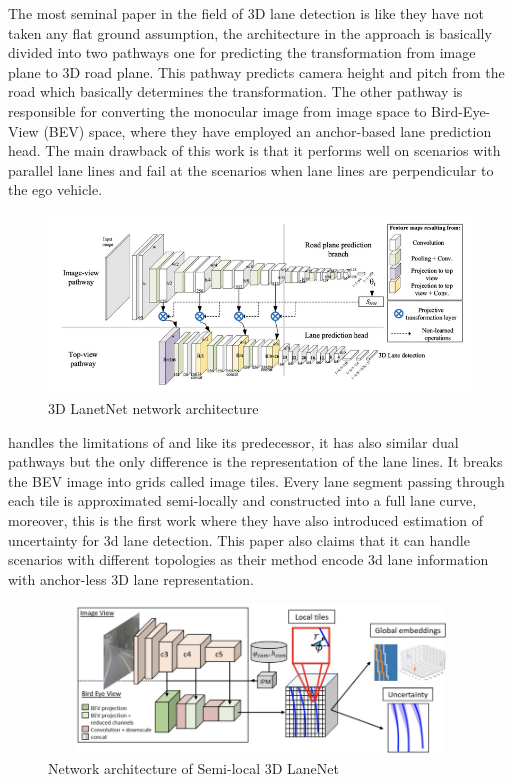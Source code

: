 The most seminal paper in the field of 3D lane detection is \cite{DBLP:journals/corr/abs-1811-10203} like \cite{DBLP:journals/corr/abs-1802-05591} they have not taken any flat ground assumption, the architecture in the approach is basically divided into two pathways one for predicting the transformation from image plane to 3D road plane. This pathway predicts camera height and pitch from the road which basically determines the transformation. The other pathway is responsible for converting the monocular image from image space to Bird-Eye-View (BEV) space, where they have employed an anchor-based lane prediction head. The main drawback of this work is that it performs well on scenarios with parallel lane lines and fail at the scenarios when lane lines are perpendicular to the ego vehicle. 

\begin{figure}[h]
    \centering
    \includegraphics[width=\textwidth]{images/3dlanenet.png}
    \caption{\cite{DBLP:journals/corr/abs-1811-10203} 3D LanetNet network architecture}
    \end{figure}

\cite{DBLP:journals/corr/abs-2011-01535} handles the limitations of \cite{DBLP:journals/corr/abs-1811-10203} and like its predecessor, it has also similar dual pathways but the only difference is the representation of the lane lines. It breaks the BEV image into grids called image tiles.
Every lane segment passing through each tile is approximated semi-locally and constructed into a full lane curve, moreover, this is the first work where they have also introduced estimation of uncertainty for 3d lane detection. This paper also claims that it can handle scenarios with different topologies as their method encode 3d lane information with anchor-less 3D lane representation. 

 \begin{figure}[h]
    \centering
    \includegraphics[width=12cm, height=4cm]{images/3DLaneNET++.png}
    \caption{Network architecture of Semi-local 3D LaneNet \cite{DBLP:journals/corr/abs-2011-01535}}
    \end{figure}

